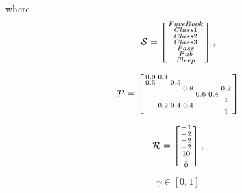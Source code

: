 \documentclass[10pt, a4paper, twocolumn]{article} %
\begin{document}
where 
\begin{align*}
	\cal{S} = 
	\begin{bmatrix}
		\begin{smallmatrix}
			FaceBook \\
			Class1 \\
			Class2 \\
			Class3 \\
			Pass\\
			Pub\\
			Sleep
		\end{smallmatrix}
	\end{bmatrix},
\end{align*}

\begin{align*}
	\cal{P} = 
	\begin{bmatrix}
		\begin{smallmatrix}
			0.9			& 0.1		 & 				&				 &			&			& \\
			0.5			&  			 & 0.5		&				 &			&			& \\
		 	& 			 & 				&	0.8		 &			&			& 0.2\\
			& 		 	 & 				&				 & 0.6	&	0.4	& \\
		 	& 		 	 & 				&				 &			&			& 1\\
			& 0.2	 	 & 0.4		&	0.4		 & 			&			& \\
		 	& 		 	 & 				&				 &			&			& 1\\
		\end{smallmatrix}
	\end{bmatrix}
\end{align*}

\begin{align*}
	\cal{R} = 
	\begin{bmatrix}
		\begin{smallmatrix}
			-1 \\
			-2 \\
			-2 \\
			-2 \\
			10 \\
			1\\
			0
		\end{smallmatrix}
	\end{bmatrix},
\end{align*}

$$\gamma \in [0,1] $$
\end{document}

